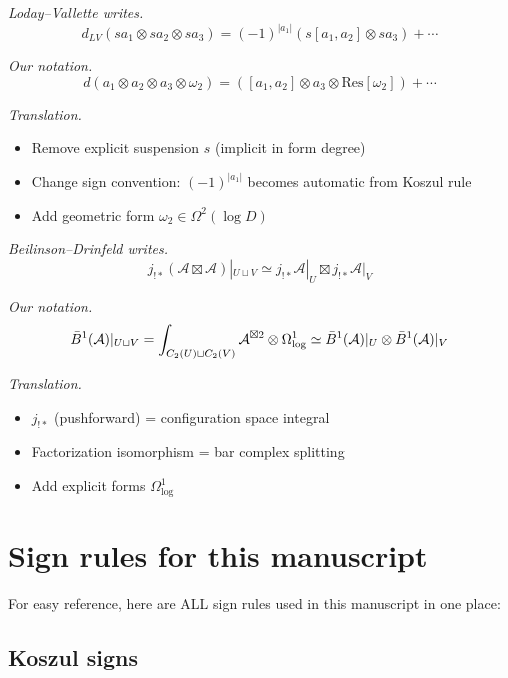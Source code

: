 \begin{example}
\emph{Loday--Vallette writes.}
\[d_{LV}(s a_1 \otimes s a_2 \otimes s a_3) = (-1)^{|a_1|} (s[a_1, a_2] \otimes s a_3) + \cdots\]

\emph{Our notation.}
\[d(a_1 \otimes a_2 \otimes a_3 \otimes \omega_2) = ([a_1, a_2] \otimes a_3 \otimes \text{Res}[\omega_2]) + \cdots\]

\emph{Translation.}
\begin{itemize}
\item Remove explicit suspension $s$ (implicit in form degree)
\item Change sign convention: $(-1)^{|a_1|}$ becomes automatic from Koszul rule
\item Add geometric form $\omega_2 \in \Omega^2(\log D)$
\end{itemize}
\end{example}

\begin{example}
\emph{Beilinson--Drinfeld writes.}
\[j_{!*}(\mathcal{A} \boxtimes \mathcal{A})|_{U \sqcup V} \simeq j_{!*}\mathcal{A}|_U \boxtimes j_{!*}\mathcal{A}|_V\]

\emph{Our notation.}
\[\bar{B}^{1}(\mathcal{A})|_{U \sqcup V} = \int_{C_2(U) \sqcup C_2(V)} \mathcal{A}^{\boxtimes 2} \otimes \Omega^1_{\log} \simeq \bar{B}^{1}(\mathcal{A})|_U \otimes \bar{B}^{1}(\mathcal{A})|_V\]

\emph{Translation.}
\begin{itemize}
\item $j_{!*}$ (pushforward) = configuration space integral
\item Factorization isomorphism = bar complex splitting
\item Add explicit forms $\Omega^1_{\log}$
\end{itemize}
\end{example}

\section{Sign rules for this manuscript}

For easy reference, here are ALL sign rules used in this manuscript in one place:

\subsection{Koszul signs}

